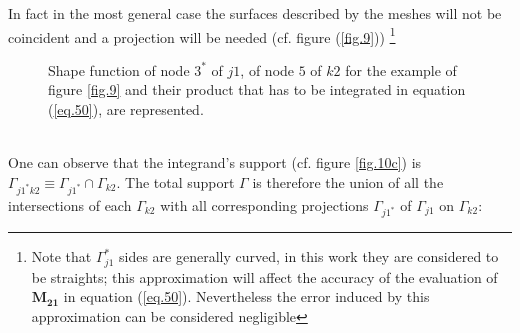 In fact in the most general case the surfaces described by the meshes will not be coincident and a projection will be needed (cf. figure (\ref{fig.9})) \footnote{Note that $\Gamma_{j1}^*$ sides are generally curved, in this work they are considered to be straights; this approximation will affect the accuracy of the evaluation of $ \mathbf{M_{21}}$ in equation (\ref{eq.50}). Nevertheless the error induced by this approximation can be considered negligible}
\begin{figure}[!ht]
\centering
     \caption{Shape function of node $3^*$ of $j1$, of node $5$ of $k2$ for the example of figure \ref{fig.9} and their product that has to be integrated in equation  (\ref{eq.50}), are represented.}
     \label{fig.10}
   \end{figure}
   \\
   One can observe that the integrand's support (cf. figure \ref{fig.10c}) is $\Gamma_{j1^*k2}\equiv \Gamma_{j1^*} \cap  \Gamma_{k2} $. The total support $\Gamma$ is therefore the union of all the intersections of each $\Gamma_{k2}$ with all corresponding projections $\Gamma_{j1^*}$ of $\Gamma_{j1}$ on $\Gamma_{k2}$:\\
